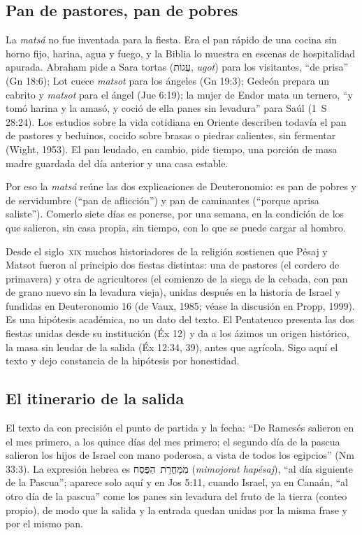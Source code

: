 \documentclass[11pt,letterpaper]{article}
\newcommand{\heb}[1]{\mbox{\foreignlanguage{hebrew}{#1}}}
\begin{document}
\subsection{Pan de pastores, pan de pobres}
La \emph{matsá} no fue inventada para la fiesta. Era el pan rápido de una cocina sin horno fijo, harina, agua y fuego, y la Biblia lo muestra en escenas de hospitalidad apurada. Abraham pide a Sara tortas (\heb{עֻגוֹת}, \emph{ugot}) para los visitantes, ``de prisa'' (Gn 18:6); Lot cuece \emph{matsot} para los ángeles (Gn 19:3); Gedeón prepara un cabrito y \emph{matsot} para el ángel (Jue 6:19); la mujer de Endor mata un ternero, ``y tomó harina y la amasó, y coció de ella panes sin levadura'' para Saúl (1~S 28:24). Los estudios sobre la vida cotidiana en Oriente describen todavía el pan de pastores y beduinos, cocido sobre brasas o piedras calientes, sin fermentar (Wight, 1953). El pan leudado, en cambio, pide tiempo, una porción de masa madre guardada del día anterior y una casa estable.

Por eso la \emph{matsá} reúne las dos explicaciones de Deuteronomio: es pan de pobres y de servidumbre (``pan de aflicción'') y pan de caminantes (``porque aprisa saliste''). Comerlo siete días es ponerse, por una semana, en la condición de los que salieron, sin casa propia, sin tiempo, con lo que se puede cargar al hombro.

\begin{nota}
Desde el siglo~\textsc{xix} muchos historiadores de la religión sostienen que Pésaj y Matsot fueron al principio dos fiestas distintas: una de pastores (el cordero de primavera) y otra de agricultores (el comienzo de la siega de la cebada, con pan de grano nuevo sin la levadura vieja), unidas después en la historia de Israel y fundidas en Deuteronomio 16 (de Vaux, 1985; véase la discusión en Propp, 1999). Es una hipótesis académica, no un dato del texto. El Pentateuco presenta las dos fiestas unidas desde su institución (Éx 12) y da a los ázimos un origen histórico, la masa sin leudar de la salida (Éx 12:34, 39), antes que agrícola. Sigo aquí el texto y dejo constancia de la hipótesis por honestidad.
\end{nota}

\subsection{El itinerario de la salida}
El texto da con precisión el punto de partida y la fecha: ``De Ramesés salieron en el mes primero, a los quince días del mes primero; el segundo día de la pascua salieron los hijos de Israel con mano poderosa, a vista de todos los egipcios'' (Nm 33:3). La expresión hebrea es \heb{מִמָּחֳרַת הַפֶּסַח} (\emph{mimojorat hapésaj}), ``al día siguiente de la Pascua''; aparece solo aquí y en Jos 5:11, cuando Israel, ya en Canaán, ``al otro día de la pascua'' come los panes sin levadura del fruto de la tierra (conteo propio), de modo que la salida y la entrada quedan unidas por la misma frase y por el mismo pan.
\end{document}
